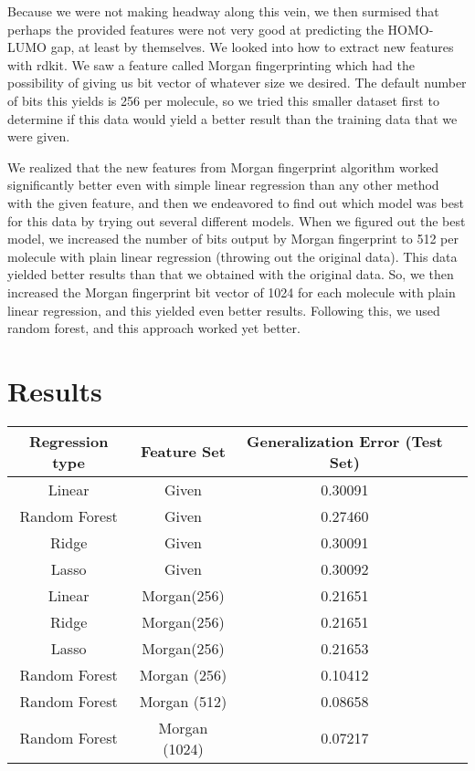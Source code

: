 \documentclass[11pt]{article}
\begin{document}
Because we were not making headway along this vein, we then surmised that perhaps the provided features were not very good at predicting the HOMO-LUMO gap, at least by themselves. We looked into how to extract new features with rdkit. We saw a feature called Morgan fingerprinting which had the possibility of giving us bit vector of whatever size we desired. The default number of bits this yields is 256 per molecule, so we tried this smaller dataset first to determine if this data would yield a better result than the training data that we were given. 

We realized that the new features from Morgan fingerprint algorithm worked significantly better even with simple linear regression than any other method with the given feature, and then we endeavored to find out which model was best for this data by trying out several different models. When we figured out the best model, we increased the number of bits output by Morgan fingerprint to 512 per molecule with plain linear regression (throwing out the original data). This data yielded better results than that we obtained with the original data. So, we then increased the Morgan fingerprint bit vector of 1024 for each molecule with plain linear regression, and this yielded even better results. Following this, we used random forest, and this approach worked yet better.

\section{Results}

\begin{center}
\begin{tabular}{|c|c|c|c|}
\hline
Regression type & Feature Set & Generalization Error (Test Set)\\
\hline
Linear &Given & 0.30091\\
Random Forest & Given& 0.27460\\
Ridge & Given& 0.30091\\
Lasso &Given& 0.30092\\
Linear&Morgan(256)& 0.21651\\
Ridge&Morgan(256)& 0.21651\\
Lasso&Morgan(256)& 0.21653 \\
Random Forest&Morgan (256)& 0.10412\\
Random Forest&Morgan (512)& 0.08658\\
Random Forest&Morgan (1024)& 0.07217\\
\hline
\end{tabular}
\end{center}
\end{document}
